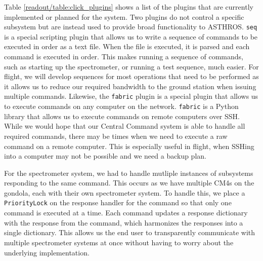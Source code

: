Table \ref{readout/table:click_plugins} shows a list of the plugins that are currently implemented or planned for the system.
Two plugins do not control a specific subsystem but are instead used to provide broad functionality to ASTHROS.
\texttt{seq} is a special scripting plugin that allows us to write a sequence of commands to be executed in order as a text file. 
When the file is executed, it is parsed and each command is executed in order.
This makes running a sequence of commands, such as starting up the spectrometer, or running a test sequence, much easier.
For flight, we will develop sequences for most operations that need to be performed as it allows us to reduce our required bandwidth to the ground station when issuing multiple commands. 
Likewise, the \texttt{fabric} plugin is a special plugin that allows us to execute commands on any computer on the network.
\texttt{fabric} is a Python library that allows us to execute commands on remote computers over SSH. 
While we would hope that our Central Command system is able to handle all required commands, there may be times when we need to execute a raw command on a remote computer.
This is especially useful in flight, when SSHing into a computer may not be possible and we need a backup plan.

For the spectrometer system, we had to handle mutliple instances of subsystems responding to the same command.
This occurs as we have multiple CM4s on the gondola, each with their own spectrometer system.
To handle this, we place a \texttt{PriorityLock} on the response handler for the command so that only one command is executed at a time.
Each command updates a response dictionary with the response from the command, which harmonizes the responses into a single dictionary.
This allows us the end user to transparently communicate with multiple spectrometer systems at once without having to worry about the underlying implementation.